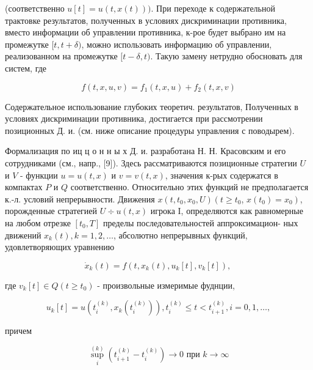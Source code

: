 \documentclass[10pt]{article}
\begin{document}
(соответственно $u[t]=u(t, x(t)))$. При переходе к содержательной трактовке результатов, полученных в условиях дискриминации противника, вместо информации об управлении противника, к-рое будет выбрано им на промежутке $[t, t+\delta)$, можно использовать информацию об управлении, реализованном на промежутке $[t-\delta, t)$. Такую замену нетрудно обосновать для систем, где



\[

f(t, x, u, v)=f_{1}(t, x, u)+f_{2}(t, x, v)

\]



Содержательное использование глубоких теоретич. результатов, Полученных в условиях дискриминации противника, достигается при рассмотрении позиционных Д. и. (см. ниже описание процедуры управления с поводырем).



Формализация по иц ц о н н ы х Д. и. разработана Н. Н. Красовским и его сотрудниками (см., напр., [9]). Здесь рассматриваются позиционные стратегии $U$ и $V$ - функции $u=u(t, x)$ и $v=v(t, x)$, значения к-рых содержатся в компактах $P$ и $Q$ соответственно. Относительно этих функций не предполагается к.-л. условий непрерывности. Движения $x\left(t, t_{0}, x_{0}, U\right)\left(t \geqslant t_{0}\right.$, $\left.x\left(t_{0}\right)=x_{0}\right)$, порожденные стратегией $U \div u(t, x)$ игрока I, определяются как равномерные на любом отрезке $\left[t_{0}, T\right]$ пределы последовательностей аппроксимацион- ных движений $x_{k}(t), k=1,2, \ldots$, абсолютно непрерывных функций, удовлетворяющих уравнению



\[

\dot{x}_{k}(t)=f\left(t, x_{k}(t), u_{k}[t], v_{k}[t]\right) \text {, }

\]



где $v_{k}[t] \in Q\left(t \geqslant t_{0}\right)$ - произвольные измеримые фуднции,



\[

u_{k}[t]=u\left(t_{i}^{(k)}, x_{k}\left(t_{i}^{(k)}\right)\right), t_{i}^{(k)} \leqslant t<t_{i+1}^{(k)}, i=0,1, \ldots,

\]



причем



\[

\sup _{i}^{(k)}\left(t_{i+1}^{(k)}-t_{i}^{(k)}\right) \longrightarrow 0 \text { при } k \longrightarrow \infty

\]
\end{document}
